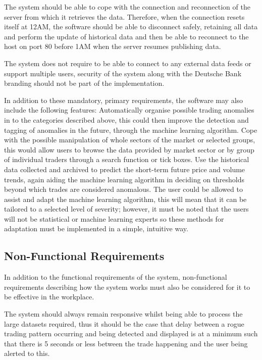 \documentclass[11pt, oneside, a4paper]{article}
\begin{document}
The system should be able to cope with the connection and reconnection of the server from which it retrieves the
data. Therefore, when the connection resets itself at 12AM, the software should be able to disconnect safely,
retaining all data and perform the update of historical data and then be able to reconnect to the host on port 80
before 1AM when the server resumes publishing data.

The system does not require to be able to connect to any external data feeds or support multiple users, security
of the system along with the Deutsche Bank branding should not be part of the implementation.

In addition to these mandatory, primary requirements, the software may also include the following features:
Automatically organise possible trading anomalies in to the categories described above, this could then improve
the detection and tagging of anomalies in the future, through the machine learning algorithm. Cope with the
possible manipulation of whole sectors of the market or selected groups, this would allow users to browse the
data provided by market sector or by group of individual traders through a search function or tick boxes. Use
the historical data collected and archived to predict the short-term future price and volume trends, again
aiding the machine learning algorithm in deciding on thresholds beyond which trades are considered anomalous.
The user could be allowed to assist and adapt the machine learning algorithm, this will mean that it can be
tailored to a selected level of severity; however, it must be noted that the users will not be statistical or
machine learning experts so these methods for adaptation must be implemented in a simple, intuitive way.

\subsection{Non-Functional Requirements}
In addition to the functional requirements of the system, non-functional requirements describing how the system
works must also be considered for it to be effective in the workplace.

The system should always remain responsive whilst being able to process the large datasets required, thus it
should be the case that delay between a rogue trading pattern occurring and being detected and displayed is at
a minimum such that there is 5 seconds or less between the trade happening and the user being alerted to this.
\end{document}
